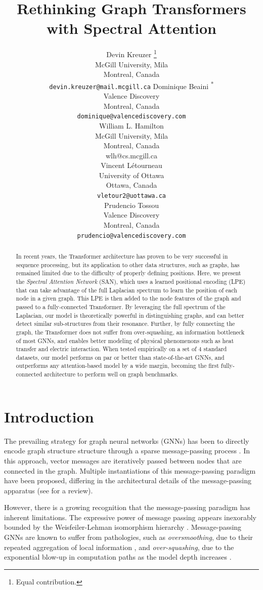 \documentclass{article}
\title{Rethinking Graph Transformers with Spectral Attention}
\author{
  
  Devin Kreuzer \thanks{Equal contribution.}
  \\
  McGill University, Mila \\
  Montreal, Canada \\
  \texttt{devin.kreuzer@mail.mcgill.ca}
   \AND
   Dominique Beaini \textsuperscript{*} \\
   Valence Discovery \\
   Montreal, Canada \\
   \texttt{dominique@valencediscovery.com} \\
   \And
   William L. Hamilton \\
   McGill University, Mila \\
   Montreal, Canada \\
   wlh@cs.mcgill.ca \\
   \And
   Vincent Létourneau \\
   University of Ottawa\\
   Ottawa, Canada \\
   \texttt{vletour2@uottawa.ca} \\
   \And
   Prudencio Tossou \\
   Valence Discovery \\
   Montreal, Canada \\
   \texttt{prudencio@valencediscovery.com} \\
}
\begin{document}
\maketitle

\begin{abstract}

In recent years, the Transformer architecture has proven to be very successful in sequence processing, but its application to other data structures, such as graphs, has remained limited due to the difficulty of properly defining positions. 
Here, we present the \textit{Spectral Attention Network} (SAN), which uses a learned positional encoding (LPE) that can take advantage of the full Laplacian spectrum to learn the position of each node in a given graph.
This LPE is then added to the node features of the graph and passed to a fully-connected Transformer.
By leveraging the full spectrum of the Laplacian, our model is theoretically powerful in distinguishing graphs, and can better detect similar sub-structures from their resonance.
Further, by fully connecting the graph, the Transformer does not suffer from over-squashing, an information bottleneck of most GNNs, and enables better modeling of physical phenomenons such as heat transfer and electric interaction.
When tested empirically on a set of 4 standard datasets, our model performs on par or better than state-of-the-art GNNs, and outperforms any attention-based model by a wide margin, becoming the first fully-connected architecture to perform well on graph benchmarks.


\end{abstract}

\section{Introduction}

The prevailing strategy for graph neural networks (GNNs) has been to directly encode graph structure structure through a sparse message-passing process \cite{gilmer2017mpnn,hamilton_2020}.
In this approach, vector messages are iteratively passed between nodes that are connected in the graph.
Multiple instantiations of this message-passing paradigm have been proposed, differing in the architectural details of the message-passing apparatus (see \cite{hamilton_2020} for a review). 

However, there is a growing recognition that the message-passing paradigm has inherent limitations.
The expressive power of message passing appears inexorably bounded by the Weisfeiler-Lehman isomorphism hierarchy  \cite{maron2019provably,morris2019weisfeiler,xu2018gin}. 
Message-passing GNNs are known to suffer from pathologies, such as {\em oversmoothing}, due to their repeated aggregation of local information \cite{hamilton_2020}, and {\em over-squashing}, due to the exponential blow-up in computation paths as the model depth increases \cite{alon_bottleneck_2020}.
\end{document}

